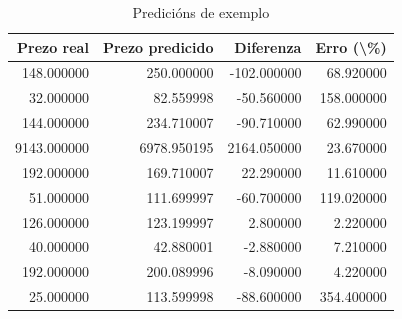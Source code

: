 \begin{table}[H]
\caption{Predicións de exemplo}
\label{tab:predicions_exemplo}
\begin{tabular}{rrrr}
\toprule
Prezo real & Prezo predicido & Diferenza & Erro (\textbackslash \%) \\
\midrule
148.000000 & 250.000000 & -102.000000 & 68.920000 \\
32.000000 & 82.559998 & -50.560000 & 158.000000 \\
144.000000 & 234.710007 & -90.710000 & 62.990000 \\
9143.000000 & 6978.950195 & 2164.050000 & 23.670000 \\
192.000000 & 169.710007 & 22.290000 & 11.610000 \\
51.000000 & 111.699997 & -60.700000 & 119.020000 \\
126.000000 & 123.199997 & 2.800000 & 2.220000 \\
40.000000 & 42.880001 & -2.880000 & 7.210000 \\
192.000000 & 200.089996 & -8.090000 & 4.220000 \\
25.000000 & 113.599998 & -88.600000 & 354.400000 \\
\bottomrule
\end{tabular}
\end{table}
